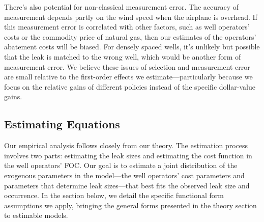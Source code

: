 There's also potential for non-classical measurement error.
The accuracy of measurement depends partly on the wind speed when the airplane is overhead.
If this measurement error is correlated with other factors, such as well operators' costs or the commodity price of natural gas, then our estimates of the operators' abatement costs will be biased.
For densely spaced wells, it's unlikely but possible that the leak is matched to the wrong well, which would be another form of measurement error.
We believe these issues of selection and measurement error are small relative to the first-order effects we estimate---particularly because we focus on the relative gains of different policies instead of the specific dollar-value gains.


\subsection{Estimating Equations}
\label{sec:estimating-equations}

Our empirical analysis follows closely from our theory.
The estimation process involves two parts: estimating the leak sizes and estimating the cost function in the well operators' \gls{FOC}.
Our goal is to estimate a joint distribution of the exogenous parameters in the model---the well operators' cost parameters and parameters that determine leak sizes---that best fits the observed leak size and occurrence.
In the section below, we detail the specific functional form assumptions we apply, bringing the general forms presented in the theory section to estimable models.


